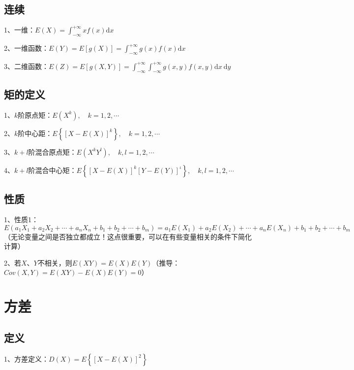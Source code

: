 \subsection{连续}

1、一维：$E(X)=\int_{-\infty}^{+\infty} x f(x) \mathrm{d} x$

2、一维函数：$E(Y)=E[g(X)]=\int_{-\infty}^{+\infty} g(x) f(x) \mathrm{d} x$

3、二维函数：$E(Z)=E[g(X, Y)]=\int_{-\infty}^{+\infty} \int_{-\infty}^{+\infty} g(x, y) f(x, y) \mathrm{d} x \mathrm{~d} y$



\subsection{矩的定义}

1、$k$阶原点矩：$E\left(X^{k}\right), \quad k=1,2, \cdots $

2、$k$阶中心距：$E\left\{[X-E(X)]^{k}\right\}, \quad k=1,2, \cdots$

3、$k+l$阶混合原点矩：$E\left(X^{k} Y^{l}\right), \quad k, l=1,2, \cdots$

4、$k+l$阶混合中心矩：$E\left\{[X-E(X)]^{k}[Y-E(Y)]^{\iota}\right\}, \quad k, l=1,2, \cdots$



\subsection{性质}

1、性质1：$E(a_1X_1+a_2X_2+\cdots+a_nX_n+b_1+b_2+\cdots+b_m)=a_1E(X_1)+a_2E(X_2)+\cdots+a_nE(X_n)+b_1+b_2+\cdots+b_m$（无论变量之间是否独立都成立！这点很重要，可以在有些变量相关的条件下简化计算）

2、若$X$、$Y$不相关，则$E ( X Y ) = E ( X ) E ( Y )$（推导：$C o v ( X , Y ) = E ( X Y ) - E ( X ) E ( Y ) =0$）

\section{方差}



\subsection{定义}

1、方差定义：$D(X)=E\left\{[X-E(X)]^{2}\right\}$

